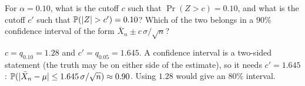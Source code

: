 \begin{exercise}
For $\alpha = 0.10$, what is the cutoff $c$ such that $\Pr(Z > c) = 0.10$, and what is the cutoff $c'$ such that $\mathbb{P}(\lvert Z\rvert > c') = 0.10$? Which of the two belongs in a $90\%$ confidence interval of the form $\bar{X}_n \pm c \, \sigma / \sqrt{n}$?
\end{exercise}
\begin{solution}
$c = q_{0.10} = 1.28$ and $c' = q_{0.05} = 1.645$. A confidence interval is a two-sided statement (the truth may be on either side of the estimate), so it needs $c' = 1.645$: $\mathbb{P}(\lvert\bar{X}_n - \mu\rvert \leq 1.645 \, \sigma/\sqrt{n}) \approx 0.90$. Using $1.28$ would give an $80\%$ interval.
\end{solution}
